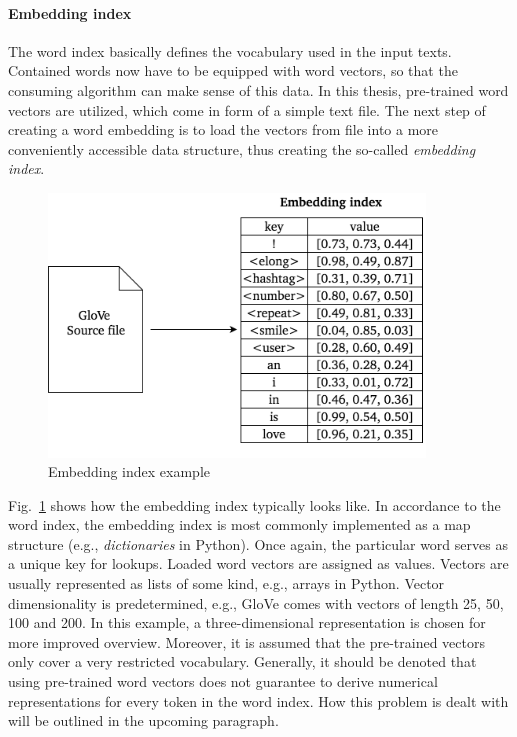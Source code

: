 \paragraph{Embedding index}
\label{sub:embedding_index}

The word index basically defines the vocabulary used in the input texts.
Contained words now have to be equipped with word vectors, so that the
consuming algorithm can make sense of this data.
In this thesis, pre-trained word vectors are utilized, which come in form of a
simple text file.
The next step of creating a word embedding is to load the vectors from file
into a more conveniently accessible data structure, thus creating the so-called
\textit{embedding index}.

\begin{figure}[h]
  \includegraphics[height=7cm]{img/text_preprocessing_4}
  \caption{Embedding index example}
\label{fig:embedding_index}
\end{figure}

Fig.~\ref{fig:embedding_index} shows how the embedding index typically looks
like.
In accordance to the word index, the embedding index is most commonly implemented
as a map structure (e.g., \textit{dictionaries} in Python).
Once again, the particular word serves as a unique key for lookups.
Loaded word vectors are assigned as values.
Vectors are usually represented as lists of some kind, e.g., arrays in Python.
Vector dimensionality is predetermined, e.g., GloVe comes with vectors of length
25, 50, 100 and 200.
In this example, a three-dimensional representation is chosen for more
improved overview.
Moreover, it is assumed that the pre-trained vectors only cover a very restricted
vocabulary.
Generally, it should be denoted that using pre-trained word vectors does not guarantee
to derive numerical representations for every token in the word index.
How this problem is dealt with will be outlined in the upcoming paragraph.

